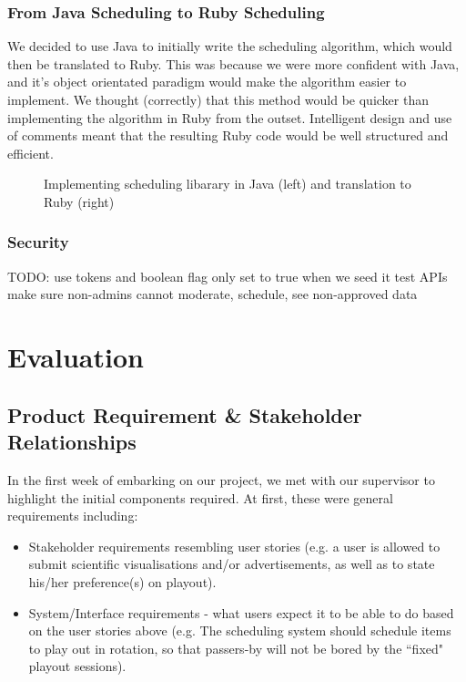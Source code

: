 \documentclass[a4paper, titlepage]{article}
\begin{document}
\subsubsection{From Java Scheduling to Ruby Scheduling}

We decided to use Java to initially write the scheduling algorithm, which would then be translated to 
Ruby. This was because we were more confident with Java, and it's object orientated paradigm would make 
the algorithm easier to implement. We thought (correctly) that this method would be quicker than
implementing the algorithm in Ruby from the outset. Intelligent design and use of comments meant that
the resulting Ruby code would be well structured and efficient.


\begin{figure}[h!]
  \begin{minipage}{0.49\textwidth}
  \end{minipage}
  \begin{minipage}{0.49\textwidth}
  \end{minipage}
    
  \caption{Implementing scheduling libarary in Java (left) and translation to Ruby (right)}
  \label{fig:impl_translation}
\end{figure}


\subsubsection{Security}
TODO: 
use tokens and boolean flag only set to true when we seed it 
test APIs 
make sure non-admins cannot moderate, schedule, see non-approved data


\newpage
\section{Evaluation}

\subsection{Product Requirement \& Stakeholder Relationships}

In the first week of embarking on our project, we met with our supervisor to highlight the initial 
components required. At first, these were general requirements including:

\begin{itemize}

  \item Stakeholder requirements resembling user stories (e.g. a user is allowed to submit scientific visualisations and/or advertisements, as well as to state his/her preference(s) on playout).

  \item System/Interface requirements - what users expect it to be able to do based on the user stories above (e.g. The scheduling system should schedule items to play out in rotation, so that passers-by will not be bored by the ``fixed" playout sessions).
\end{itemize}
\end{document}
